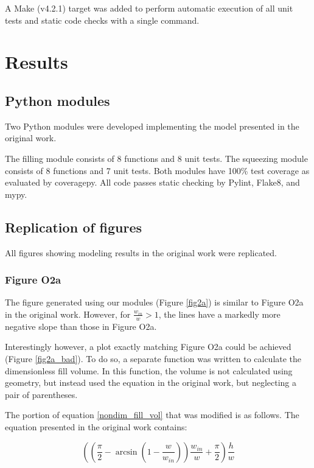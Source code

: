 A Make\supercite{feldman_gnu_1988} (v4.2.1) target was added to perform automatic execution of all
unit tests and static code checks with a single command.

\section{Results}

\subsection{Python modules}

Two Python modules were developed implementing the model presented in the original work.

The filling module consists of 8 functions and 8 unit tests. The squeezing module consists
of 8 functions and 7 unit tests. Both modules have 100\% test coverage as evaluated by
coveragepy. All code passes static checking by Pylint, Flake8, and mypy.

\subsection{Replication of figures}

All figures showing modeling results in the original work were replicated. 

\subsubsection{Figure O2a}

The figure generated using our modules (Figure \ref{fig2a}) is similar to
Figure O2a in the original work. However, for $\frac{w_{in}}{w}>1$, the
lines have a markedly more negative slope than those in Figure O2a.

Interestingly however, a plot exactly matching Figure O2a could be achieved
(Figure \ref{fig2a_bad}). To do so,
a separate function was written to calculate the dimensionless fill volume. In this function,
the volume is not calculated using geometry, but instead used the equation in the original work,
but neglecting a pair of parentheses.

The portion of equation \eqref{nondim_fill_vol} that was modified is as follows. The equation
presented in the original work contains:

$$
\left(\left(\frac{\pi}{2} -
\arcsin\left(1 - \frac{w}{w_{in}}\right)\right)\frac{w_{in}}{w} +
\frac{\pi}{2}\right)\frac{h}{w}
$$

